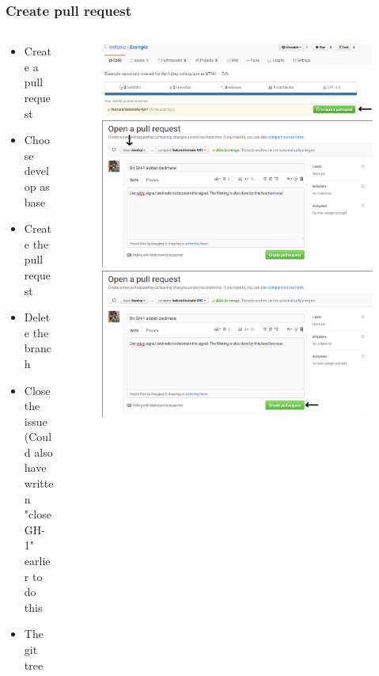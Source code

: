 \begin{frame}
	\frametitle{Create pull request}
	\begin{columns}
		\begin{column}{0.4\textwidth}
			\begin{itemize}[<+->]
				\item Create a pull request
				\item Choose develop as base
				\item Create the pull request
				\item Delete the branch
				\item Close the issue (Could also have written "close GH-1" earlier to do this
				\item The git tree
			\end{itemize}
		\end{column}
		\begin{column}{0.6\textwidth}
			\begin{figure}
				\centering
				\begin{overprint}
					\includegraphics[width=\textwidth]{./pictures/compare_and_pull.png}
					\onslide<2>\includegraphics[width=\textwidth]{./pictures/base_develop.png}
					\onslide<3>\includegraphics[width=\textwidth]{./pictures/create_pull.png}

\end{overprint}
\end{figure}
\end{column}
\end{columns}
\end{frame}
